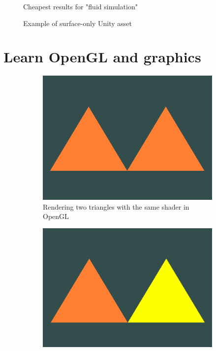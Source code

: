 \documentclass[a4paper, 12pt]{article}
\newcommand{\wideimage}[2][]{%
  \makebox[\textwidth][c]{\texttt{[image: \#2]}}%
}
\begin{document}
    \begin{figure}[H]
        \wideimage[width=1.4\textwidth]{unityStore2.png}
        \caption{Cheapest results for "fluid simulation" \cite{unityasset}}
    \end{figure}

    \begin{figure}[H]
        \wideimage[]{stylizedWaterURP.png}
        \caption{Example of surface-only Unity asset \cite{stylized}}
    \end{figure}

    \section{Learn OpenGL and graphics}

    \begin{figure}[H]
        \centering
        \begin{subfigure}[b]{0.45\textwidth}
            \centering
            \includegraphics[width=\textwidth]{openGL2Triangles.png}
            \caption{Rendering two triangles with the same shader in OpenGL}
        \end{subfigure}
        \hfill
        \begin{subfigure}[b]{0.45\textwidth}
            \centering
            \includegraphics[width=\textwidth]{openGL2Triangles2Shaders.png}

\end{subfigure}
\end{figure}
\end{document}
